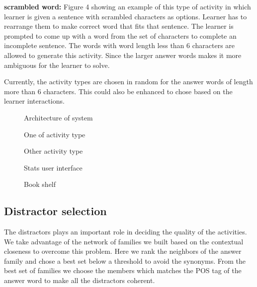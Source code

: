 \documentclass[11pt,a4paper]{article}
\begin{document}
\textbf{scrambled word:} Figure 4 showing an example of this type of activity in which learner is given a sentence with scrambled characters as options. Learner has to rearrange them to make correct word that fits that sentence.  The learner is prompted to come up with a word from the
set of characters to complete an incomplete sentence. The words with word length
less than 6 characters are allowed to generate this activity. Since the larger
answer words makes it more ambiguous for the learner to solve.

Currently, the activity types are chosen in random for the answer words of length
more than 6 characters. This could also be enhanced to chose based on the learner
interactions.

\begin{figure}
\begin{tcbraster}[raster columns=1, enhanced, blankest]
\caption{Architecture of system}

\end{tcbraster}
\end{figure}


\begin{figure}
\begin{tcbraster}[raster columns=1, enhanced, blankest]
\caption{One of activity type}

\caption{Other activity type}

\caption{Stats user interface}


\caption{Book shelf}

\end{tcbraster}
\end{figure}

\subsection{Distractor selection}
The distractors plays an important role in deciding the quality of the activities.
We take advantage of the network of families we built based on the contextual
closeness to overcome this problem. Here we rank the neighbors of the
answer family and chose a best set below a threshold to avoid the synonyms. From
the best set of families we choose the members which matches the POS tag of the
answer word to make all the distractors coherent.
\end{document}
